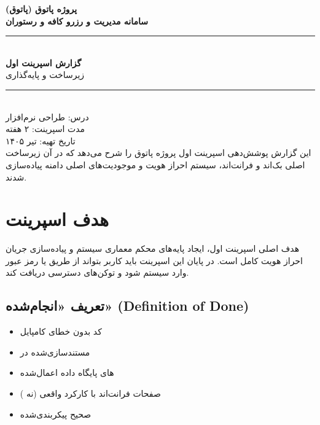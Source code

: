 \documentclass[12pt, a4paper]{article}
\begin{document}

\begin{titlepage}
\centering
\vspace*{2cm}
{\LARGE\bfseries پروژه پاتوق (پاتوق)\\[0.5em]}
{\Large\bfseries سامانه مدیریت و رزرو کافه و رستوران\\[2em]}
\rule{\linewidth}{0.5mm}\\[1em]
{\huge\bfseries\color{primaryorange} گزارش اسپرینت اول}\\[0.5em]
{\Large زیرساخت و پایه‌گذاری}\\[1em]
\rule{\linewidth}{0.5mm}\\[2em]
{\large درس: طراحی نرم‌افزار\\[0.5em]}
{\large مدت اسپرینت: ۲ هفته\\[0.5em]}
{\large تاریخ تهیه: تیر ۱۴۰۵}\\[3em]
\vfill
{\normalsize\color{darkgray}
این گزارش پوشش‌دهی اسپرینت اول پروژه پاتوق را شرح می‌دهد که
در آن زیرساخت اصلی بک‌اند و فرانت‌اند، سیستم احراز هویت و
موجودیت‌های اصلی دامنه پیاده‌سازی شدند.}
\end{titlepage}

\tableofcontents
\newpage

\section{هدف اسپرینت}

هدف اصلی اسپرینت اول، ایجاد پایه‌های محکم معماری سیستم و پیاده‌سازی جریان
احراز هویت کامل است. در پایان این اسپرینت باید کاربر بتواند از طریق 
یا رمز عبور وارد سیستم شود و توکن‌های دسترسی دریافت کند.

\subsection{تعریف «انجام‌شده» (Definition of Done)}
\begin{itemize}[rightmargin=0.5cm]
  \item کد بدون خطای کامپایل
  \item {} مستندسازی‌شده در 
  \item {}های پایگاه داده اعمال‌شده
  \item صفحات فرانت‌اند با  کارکرد واقعی (نه )
  \item {} صحیح پیکربندی‌شده
\end{itemize}
\end{document}
